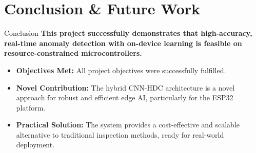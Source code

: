 \documentclass{beamer}
\begin{document}
\section{Conclusion \& Future Work}
\begin{frame}{Conclusion}
    \textbf{This project successfully demonstrates that high-accuracy, real-time anomaly detection with on-device learning is feasible on resource-constrained microcontrollers.}
    \begin{itemize}
        \item \textbf{Objectives Met:} All project objectives were successfully fulfilled.
        \item \textbf{Novel Contribution:} The hybrid CNN-HDC architecture is a novel approach for robust and efficient edge AI, particularly for the ESP32 platform.
        \item \textbf{Practical Solution:} The system provides a cost-effective and scalable alternative to traditional inspection methods, ready for real-world deployment.
    \end{itemize}
\end{frame}
\end{document}
